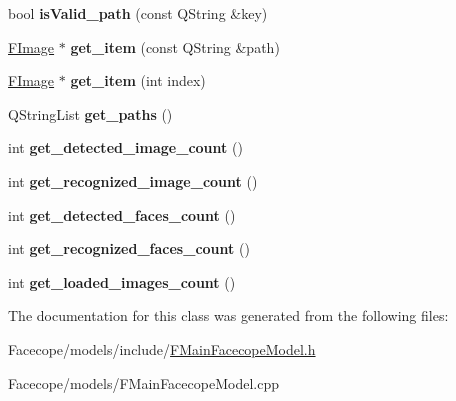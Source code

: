 \begin{DoxyCompactItemize}
bool {\bfseries is\+Valid\+\_\+path} (const Q\+String \&key)
\item 
\mbox{\label{classFMainFacecopeModel_acf65e2eb6cd2ebd5f1ddc448de077a04}} 
\hyperlink{classFImage}{F\+Image} $\ast$ {\bfseries get\+\_\+item} (const Q\+String \&path)
\item 
\mbox{\label{classFMainFacecopeModel_aef457c2256cfa706fb1dd98bf7106c45}} 
\hyperlink{classFImage}{F\+Image} $\ast$ {\bfseries get\+\_\+item} (int index)
\item 
\mbox{\label{classFMainFacecopeModel_af0ed30ded3f6f2006d2e24ba1a5f8cb1}} 
Q\+String\+List {\bfseries get\+\_\+paths} ()
\item 
\mbox{\label{classFMainFacecopeModel_aec85665ecd3eab4e6afb0c1f235e9ab5}} 
int {\bfseries get\+\_\+detected\+\_\+image\+\_\+count} ()
\item 
\mbox{\label{classFMainFacecopeModel_a3696dceac101ebfccc8a92eba2665aea}} 
int {\bfseries get\+\_\+recognized\+\_\+image\+\_\+count} ()
\item 
\mbox{\label{classFMainFacecopeModel_a5ad9d47c93e55787f4ff3c875a1bb937}} 
int {\bfseries get\+\_\+detected\+\_\+faces\+\_\+count} ()
\item 
\mbox{\label{classFMainFacecopeModel_a632ecbb41c7cd190cef750e4829d1556}} 
int {\bfseries get\+\_\+recognized\+\_\+faces\+\_\+count} ()
\item 
\mbox{\label{classFMainFacecopeModel_a65c4b0a8bfe723266905329c17c66341}} 
int {\bfseries get\+\_\+loaded\+\_\+images\+\_\+count} ()
\end{DoxyCompactItemize}


The documentation for this class was generated from the following files\+:\begin{DoxyCompactItemize}
\item 
Facecope/models/include/\hyperlink{FMainFacecopeModel_8h}{F\+Main\+Facecope\+Model.\+h}\item 
Facecope/models/F\+Main\+Facecope\+Model.\+cpp\end{DoxyCompactItemize}
